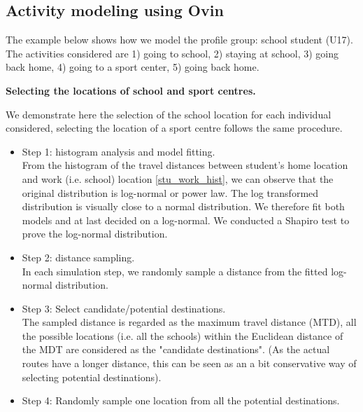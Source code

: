 \documentclass[]{article}
\begin{document}
\subsection{Activity modeling using Ovin}
The example below shows how we model the profile group: school student (U17). The activities considered are 1) going to school, 2) staying at school, 3) going back home, 4) going to a sport center, 5) going back home.  


\textbf{Selecting the locations of school and sport centres.}

We demonstrate here the selection of the school location for each individual considered, selecting the location of a sport centre follows the same procedure.   
\begin{itemize}
    \item Step 1: histogram analysis and model fitting. \\ From the histogram of the travel distances between student's home location and work (i.e. school) location \cref{stu_work_hist}, we can observe that the original distribution is log-normal or power law. The log transformed distribution is visually close to a normal distribution. We therefore fit both models and at last decided on a log-normal. We conducted a Shapiro test to prove the log-normal distribution.  
    
    \item Step 2: distance sampling. \\ In each simulation step, we randomly sample a distance from the fitted log-normal distribution.
    
    \item Step 3: Select candidate/potential destinations. \\ The sampled distance is regarded as the maximum travel distance (MTD), all the possible locations (i.e. all the schools) within the Euclidean distance of the MDT are considered as the "candidate destinations". (As the actual routes have a longer distance, this can be seen as an a bit conservative way of selecting potential destinations). 
    
    \item Step 4: Randomly sample one location from all the potential destinations.
    
\end{itemize}
\end{document}
